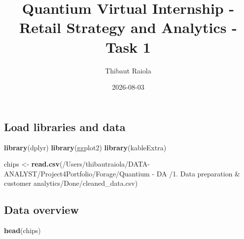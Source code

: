 \documentclass[
]{article}
\title{Quantium Virtual Internship - Retail Strategy and Analytics -
Task 1}
\author{Thibaut Raiola}
\date{2026-08-03}
\newenvironment{Shaded}{\begin{snugshade}}{\end{snugshade}}
\newcommand{\FunctionTok}[1]{\textcolor[rgb]{0.13,0.29,0.53}{\textbf{#1}}}
\newcommand{\NormalTok}[1]{#1}
\newcommand{\OtherTok}[1]{\textcolor[rgb]{0.56,0.35,0.01}{#1}}
\newcommand{\StringTok}[1]{\textcolor[rgb]{0.31,0.60,0.02}{#1}}
\begin{document}
\maketitle

\subsection{Load libraries and data}\label{load-libraries-and-data}

\begin{Shaded}
\begin{Highlighting}[]
\FunctionTok{library}\NormalTok{(dplyr)}
\FunctionTok{library}\NormalTok{(ggplot2)}
\FunctionTok{library}\NormalTok{(kableExtra)}
\end{Highlighting}
\end{Shaded}

\begin{Shaded}
\begin{Highlighting}[]
\NormalTok{chips }\OtherTok{\textless{}{-}} \FunctionTok{read.csv}\NormalTok{(}\StringTok{\textquotesingle{}/Users/thibautraiola/DATA{-}ANALYST/Project4Portfolio/Forage/Quantium {-} DA /1. Data preparation \& customer analytics/Done/cleaned\_data.csv\textquotesingle{}}\NormalTok{)}
\end{Highlighting}
\end{Shaded}

\subsection{Data overview}\label{data-overview}

\begin{Shaded}
\begin{Highlighting}[]
\FunctionTok{head}\NormalTok{(chips)}
\end{Highlighting}
\end{Shaded}
\end{document}
